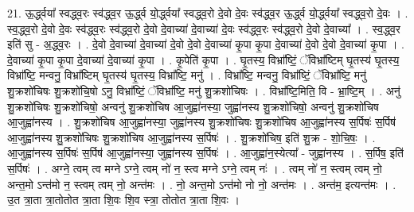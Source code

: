 \documentclass[17pt]{extarticle}
\begin{document}
21. ऊ॒र्द्ध्वया᳚ स्वद्ध्व॒रः स्व॑द्ध्व॒र ऊ॒र्द्ध्व यो॒र्द्ध्वया᳚ स्वद्ध्व॒रो दे॒वो दे॒वः स्व॑द्ध्व॒र 
ऊ॒र्द्ध्व यो॒र्द्ध्वया᳚ स्वद्ध्व॒रो दे॒वः । . स्व॒द्ध्व॒रो दे॒वो दे॒वः स्व॑द्ध्व॒रः स्व॑द्ध्व॒रो दे॒वो दे॒वाच्या॑ दे॒वाच्या॑ दे॒वः स्व॑द्ध्व॒रः स्व॑द्ध्व॒रो दे॒वो दे॒वाच्या᳚ । . स्व॒द्ध्व॒र इति॑ सु - अ॒द्ध्व॒रः । . दे॒वो दे॒वाच्या॑ दे॒वाच्या॑ दे॒वो दे॒वो दे॒वाच्या॑ कृ॒पा कृ॒पा दे॒वाच्या॑ दे॒वो दे॒वो दे॒वाच्या॑ कृ॒पा । . दे॒वाच्या॑ कृ॒पा कृ॒पा दे॒वाच्या॑ दे॒वाच्या॑ कृ॒पा । . कृ॒पेति॑ कृ॒पा । . घृ॒तस्य॒ विभ्रा᳚ष्टिं॒ ॅविभ्रा᳚ष्टिम् घृ॒तस्य॑ घृ॒तस्य॒ विभ्रा᳚ष्टि॒ मन्वनु॒ विभ्रा᳚ष्टिम् घृ॒तस्य॑ 
घृ॒तस्य॒ विभ्रा᳚ष्टि॒ मनु॑ । . विभ्रा᳚ष्टि॒ मन्वनु॒ विभ्रा᳚ष्टिं॒ ॅविभ्रा᳚ष्टि॒ मनु॑ शु॒क्रशो॑चिषः शु॒क्रशो॑चि॒षो ऽनु॒ विभ्रा᳚ष्टिं॒ ॅविभ्रा᳚ष्टि॒ मनु॑ शु॒क्रशो॑चिषः । . विभ्रा᳚ष्टि॒मिति॒ वि - भ्रा॒ष्टि॒म् । . अनु॑ शु॒क्रशो॑चिषः शु॒क्रशो॑चिषो॒ अन्वनु॑ शु॒क्रशो॑चिष आ॒जुह्वा॑नस्या॒ जुह्वा॑नस्य शु॒क्रशो॑चिषो॒ अन्वनु॑ शु॒क्रशो॑चिष आ॒जुह्वा॑नस्य । . शु॒क्रशो॑चिष आ॒जुह्वा॑नस्या॒ जुह्वा॑नस्य शु॒क्रशो॑चिषः शु॒क्रशो॑चिष आ॒जुह्वा॑नस्य स॒र्पिषः॑ स॒र्पिष॑ आ॒जुह्वा॑नस्य शु॒क्रशो॑चिषः शु॒क्रशो॑चिष आ॒जुह्वा॑नस्य स॒र्पिषः॑ । . शु॒क्रशो॑चिष॒ इति॑ शु॒क्र - शो॒चि॒षः॒ । . आ॒जुह्वा॑नस्य स॒र्पिषः॑ स॒र्पिष॑ आ॒जुह्वा॑नस्या॒ जुह्वा॑नस्य स॒र्पिषः॑ । . आ॒जुह्वा॑न॒स्येत्या᳚ - जुह्वा॑नस्य । . स॒र्पिष॒ इति॑ स॒र्पिषः॑ । . अग्ने॒ त्वम् त्व मग्ने ऽग्ने॒ त्वम् नो॑ न॒ स्त्व मग्ने ऽग्ने॒ त्वम् नः॑ । . त्वम् नो॑ न॒ स्त्वम् त्वम् नो॒ अन्त॒मो ऽन्त॑मो न॒ स्त्वम् त्वम् नो॒ अन्त॑मः । . नो॒ अन्त॒मो ऽन्त॑मो नो नो॒ अन्त॑मः । . अन्त॑म॒ इत्यन्त॑मः । . उ॒त त्रा॒ता त्रा॒तोतोत त्रा॒ता शि॒वः शि॒व स्त्रा॒ तोतोत त्रा॒ता शि॒वः । \newline
\end{document}
